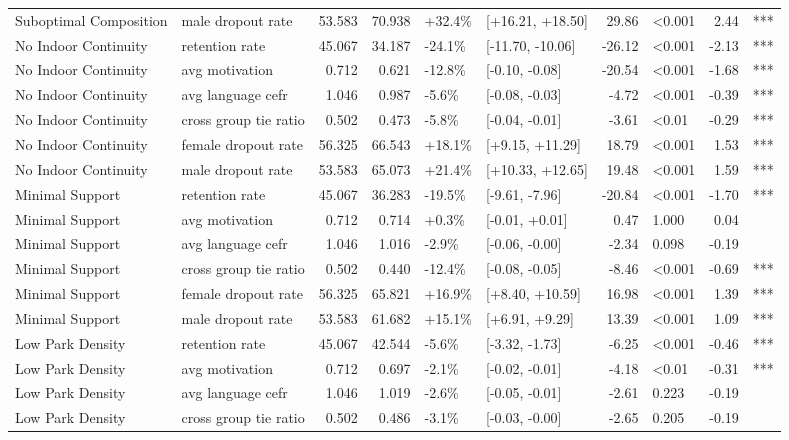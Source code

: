 \begin{longtable}[t]{llrrllrlrl}
Suboptimal Composition & male dropout rate & 53.583 & 70.938 & +32.4\% & {}[+16.21, +18.50] & 29.86 & <0.001 & 2.44 & ***\\
No Indoor Continuity & retention rate & 45.067 & 34.187 & -24.1\% & {}[-11.70, -10.06] & -26.12 & <0.001 & -2.13 & ***\\
No Indoor Continuity & avg motivation & 0.712 & 0.621 & -12.8\% & {}[-0.10, -0.08] & -20.54 & <0.001 & -1.68 & ***\\
No Indoor Continuity & avg language cefr & 1.046 & 0.987 & -5.6\% & {}[-0.08, -0.03] & -4.72 & <0.001 & -0.39 & ***\\
\addlinespace
No Indoor Continuity & cross group tie ratio & 0.502 & 0.473 & -5.8\% & {}[-0.04, -0.01] & -3.61 & <0.01 & -0.29 & ***\\
No Indoor Continuity & female dropout rate & 56.325 & 66.543 & +18.1\% & {}[+9.15, +11.29] & 18.79 & <0.001 & 1.53 & ***\\
No Indoor Continuity & male dropout rate & 53.583 & 65.073 & +21.4\% & {}[+10.33, +12.65] & 19.48 & <0.001 & 1.59 & ***\\
Minimal Support & retention rate & 45.067 & 36.283 & -19.5\% & {}[-9.61, -7.96] & -20.84 & <0.001 & -1.70 & ***\\
Minimal Support & avg motivation & 0.712 & 0.714 & +0.3\% & {}[-0.01, +0.01] & 0.47 & 1.000 & 0.04 & \\
\addlinespace
Minimal Support & avg language cefr & 1.046 & 1.016 & -2.9\% & {}[-0.06, -0.00] & -2.34 & 0.098 & -0.19 & \\
Minimal Support & cross group tie ratio & 0.502 & 0.440 & -12.4\% & {}[-0.08, -0.05] & -8.46 & <0.001 & -0.69 & ***\\
Minimal Support & female dropout rate & 56.325 & 65.821 & +16.9\% & {}[+8.40, +10.59] & 16.98 & <0.001 & 1.39 & ***\\
Minimal Support & male dropout rate & 53.583 & 61.682 & +15.1\% & {}[+6.91, +9.29] & 13.39 & <0.001 & 1.09 & ***\\
Low Park Density & retention rate & 45.067 & 42.544 & -5.6\% & {}[-3.32, -1.73] & -6.25 & <0.001 & -0.46 & ***\\
\addlinespace
Low Park Density & avg motivation & 0.712 & 0.697 & -2.1\% & {}[-0.02, -0.01] & -4.18 & <0.01 & -0.31 & ***\\
Low Park Density & avg language cefr & 1.046 & 1.019 & -2.6\% & {}[-0.05, -0.01] & -2.61 & 0.223 & -0.19 & \\
Low Park Density & cross group tie ratio & 0.502 & 0.486 & -3.1\% & {}[-0.03, -0.00] & -2.65 & 0.205 & -0.19 & \\

\end{longtable}
